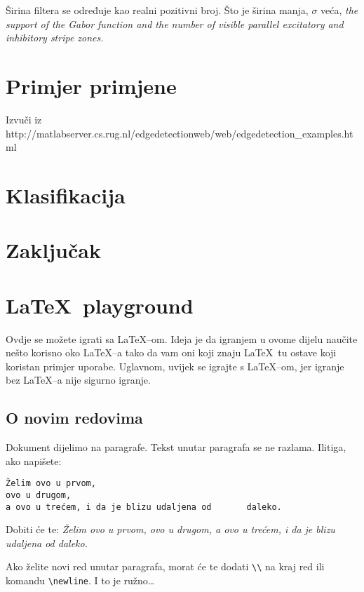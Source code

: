 \documentclass{article}
\begin{document}
Širina filtera se određuje kao realni pozitivni broj. Što je širina manja,
$\sigma$ veća, \emph{the support of the Gabor function and the number of
visible parallel excitatory and inhibitory stripe zones.}

\section{Primjer primjene}
Izvuči iz http://matlabserver.cs.rug.nl/edgedetectionweb/web/edgedetection\_examples.html

\section{Klasifikacija}

\section{Zaključak}




\newpage
\appendix
\section{\LaTeX~playground}
Ovdje se možete igrati sa \LaTeX--om. Ideja je da igranjem u ovome dijelu
naučite nešto korisno oko \LaTeX--a tako da vam oni koji znaju \LaTeX~tu ostave
koji koristan primjer uporabe. Uglavnom, uvijek se igrajte s \LaTeX--om, jer igranje bez \LaTeX--a nije sigurno igranje. 

\subsection{O novim redovima}
Dokument dijelimo na paragrafe. Tekst unutar paragrafa se ne razlama. Ilitiga,
ako napišete:
\begin{verbatim}
Želim ovo u prvom,
ovo u drugom,
a ovo u trećem, i da je blizu udaljena od       daleko.
\end{verbatim}
Dobiti će te:
\emph{Želim ovo u prvom,
ovo u drugom,
a ovo u trećem, i da je blizu udaljena od       daleko.}

Ako želite novi red unutar paragrafa, morat će te dodati
\verb|\\| na kraj red ili komandu \verb|\newline|. I to je ružno\ldots
\end{document}
